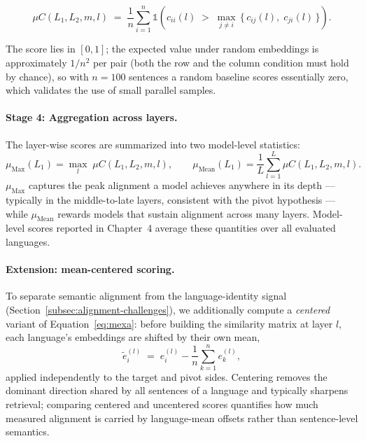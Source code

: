 \begin{equation}
    \mu C(L_1, L_2, m, l)
    \;=\;
    \frac{1}{n}
    \sum_{i=1}^{n}
    \mathbb{1}\!\left(
        c_{ii}(l) \;>\; \max_{j \neq i}\,\{\, c_{ij}(l),\; c_{ji}(l) \,\}
    \right).
    \label{eq:mexa}
\end{equation}

The score lies in $[0, 1]$; the expected value under random embeddings is
approximately $1/n^2$ per pair (both the row and the column condition must
hold by chance), so with $n = 100$ sentences a random baseline scores
essentially zero, which validates the use of small parallel samples.

\paragraph{Stage 4: Aggregation across layers.}
The layer-wise scores are summarized into two model-level statistics:
\begin{equation}
    \mu_{\text{Max}}(L_1) = \max_{l} \; \mu C(L_1, L_2, m, l),
    \qquad
    \mu_{\text{Mean}}(L_1) = \frac{1}{L} \sum_{l=1}^{L} \mu C(L_1, L_2, m, l).
\end{equation}
$\mu_{\text{Max}}$ captures the peak alignment a model achieves anywhere
in its depth --- typically in the middle-to-late layers, consistent with
the pivot hypothesis --- while $\mu_{\text{Mean}}$ rewards models that
sustain alignment across many layers. Model-level scores reported in
Chapter~4 average these quantities over all evaluated languages.

\paragraph{Extension: mean-centered scoring.}
To separate semantic alignment from the language-identity signal
(Section~\ref{subsec:alignment-challenges}), we additionally compute a
\emph{centered} variant of Equation~\eqref{eq:mexa}: before building the
similarity matrix at layer $l$, each language's embeddings are shifted by
their own mean,
\begin{equation}
    \tilde{e}_i^{(l)} \;=\; e_i^{(l)} - \frac{1}{n}\sum_{k=1}^{n} e_k^{(l)},
\end{equation}
applied independently to the target and pivot sides. Centering removes the
dominant direction shared by all sentences of a language and typically
sharpens retrieval; comparing centered and uncentered scores quantifies
how much measured alignment is carried by language-mean offsets rather
than sentence-level semantics.

